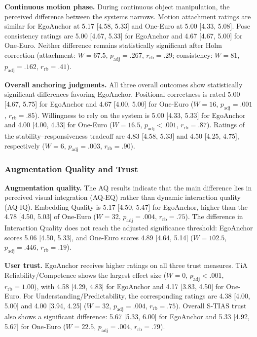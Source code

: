 \documentclass[review]{vgtc}
\begin{document}
\textbf{Continuous motion phase.}
During continuous object manipulation, the perceived difference between the systems narrows. Motion attachment ratings are similar for EgoAnchor at 5.17 [4.58, 5.33] and One-Euro at 5.00 [4.33, 5.08]. Pose consistency ratings are 5.00 [4.67, 5.33] for EgoAnchor and 4.67 [4.67, 5.00] for One-Euro. Neither difference remains statistically significant after Holm correction (attachment: $W=67.5$, $p_{\mathrm{adj}}=.267$, $r_{\mathrm{rb}}=.29$; consistency: $W=81$, $p_{\mathrm{adj}}=.162$, $r_{\mathrm{rb}}=.41$).

\textbf{Overall anchoring judgments.}
All three overall outcomes show statistically significant differences favoring EgoAnchor. Positional correctness is rated 5.00 [4.67, 5.75] for EgoAnchor and 4.67 [4.00, 5.00] for One-Euro ($W=16$, $p_{\mathrm{adj}}=.001$, $r_{\mathrm{rb}}=.85$). Willingness to rely on the system is 5.00 [4.33, 5.33] for EgoAnchor and 4.00 [4.00, 4.33] for One-Euro ($W=16.5$, $p_{\mathrm{adj}}<.001$, $r_{\mathrm{rb}}=.87$). Ratings of the stability--responsiveness tradeoff are 4.83 [4.58, 5.33] and 4.50 [4.25, 4.75], respectively ($W=6$, $p_{\mathrm{adj}}=.003$, $r_{\mathrm{rb}}=.90$).

\subsubsection{Augmentation Quality and Trust}

\textbf{Augmentation quality.}
The AQ results indicate that the main difference lies in perceived visual integration (AQ-EQ) rather than dynamic interaction quality (AQ-IQ). Embedding Quality is 5.17 [4.50, 5.47] for EgoAnchor, higher than the 4.78 [4.50, 5.03] of One-Euro ($W=32$, $p_{\mathrm{adj}}=.004$, $r_{\mathrm{rb}}=.75$). The difference in Interaction Quality does not reach the adjusted significance threshold: EgoAnchor scores 5.06 [4.50, 5.33], and One-Euro scores 4.89 [4.64, 5.14] ($W=102.5$, $p_{\mathrm{adj}}=.446$, $r_{\mathrm{rb}}=.19$).

\textbf{User trust.}
EgoAnchor receives higher ratings on all three trust measures. TiA Reliability/Competence shows the largest effect size ($W=0$, $p_{\mathrm{adj}}<.001$, $r_{\mathrm{rb}}=1.00$), with 4.58 [4.29, 4.83] for EgoAnchor and 4.17 [3.83, 4.50] for One-Euro. For Understanding/Predictability, the corresponding ratings are 4.38 [4.00, 5.00] and 4.00 [3.94, 4.25] ($W=32$, $p_{\mathrm{adj}}=.004$, $r_{\mathrm{rb}}=.75$). Overall S-TIAS trust also shows a significant difference: 5.67 [5.33, 6.00] for EgoAnchor and 5.33 [4.92, 5.67] for One-Euro ($W=22.5$, $p_{\mathrm{adj}}=.004$, $r_{\mathrm{rb}}=.79$).
\end{document}
